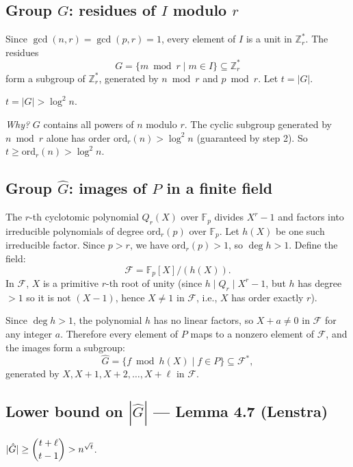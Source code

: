 \documentclass[12pt]{article}
\newcommand{\Z}{\mathbb{Z}}
\newcommand{\ord}{\mathrm{ord}}
\begin{document}
\subsection{Group $G$: residues of $I$ modulo $r$}

Since $\gcd(n,r)=\gcd(p,r)=1$, every element of $I$ is a unit in $\Z_r^*$. The residues
\[
  G = \{m \bmod r \mid m\in I\} \subseteq \Z_r^*
\]
form a subgroup of $\Z_r^*$, generated by $n\bmod r$ and $p\bmod r$. Let $t = |G|$.

\begin{thmbox}[Size of $G$]
$t = |G| > \log^2 n$.
\end{thmbox}

\textit{Why?} $G$ contains all powers of $n$ modulo $r$. The cyclic subgroup generated by $n\bmod r$ alone has order $\ord_r(n)>\log^2 n$ (guaranteed by step 2). So $t\geq\ord_r(n)>\log^2 n$.

\subsection{Group $\hat{G}$: images of $P$ in a finite field}

The $r$-th cyclotomic polynomial $Q_r(X)$ over $\mathbb{F}_p$ divides $X^r-1$ and factors into irreducible polynomials of degree $\ord_r(p)$ over $\mathbb{F}_p$. Let $h(X)$ be one such irreducible factor. Since $p>r$, we have $\ord_r(p)>1$, so $\deg h > 1$. Define the field:
\[
  \mathcal{F} = \mathbb{F}_p[X]/(h(X)).
\]
In $\mathcal{F}$, $X$ is a primitive $r$-th root of unity (since $h\mid Q_r\mid X^r-1$, but $h$ has degree $>1$ so it is not $(X-1)$, hence $X\neq 1$ in $\mathcal{F}$, i.e., $X$ has order exactly $r$).

Since $\deg h > 1$, the polynomial $h$ has no linear factors, so $X+a\neq 0$ in $\mathcal{F}$ for any integer $a$. Therefore every element of $P$ maps to a nonzero element of $\mathcal{F}$, and the images form a subgroup:
\[
  \hat{G} = \{f\bmod h(X) \mid f\in P\} \subseteq \mathcal{F}^*,
\]
generated by $X, X+1, X+2, \ldots, X+\ell$ in $\mathcal{F}$.

\subsection{Lower bound on $|\hat{G}|$ --- Lemma 4.7 (Lenstra)}

\begin{thmbox}[Lemma 4.7]
$|\hat{G}| \geq \dbinom{t+\ell}{t-1} > n^{\sqrt{t}}$.
\end{thmbox}
\end{document}
